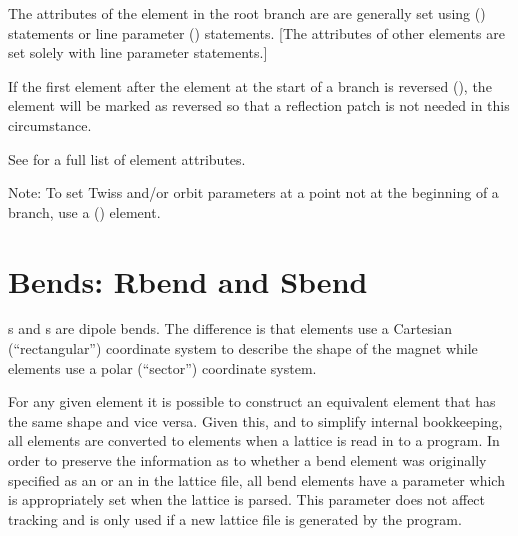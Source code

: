The attributes of the  element in the root branch are are generally set using
 () statements or line parameter () statements.
[The attributes of other  elements are set solely with line parameter statements.]

If the first element after the  element at the start of a branch is reversed
(), the  element will be marked as reversed so that a
reflection patch is not needed in this circumstance.

See  for a full list of element attributes.

Note: To set Twiss and/or orbit parameters at a point not at the beginning of a branch,
use a  () element.

\newpage

\section{Bends: Rbend and Sbend}
\label{s:bend}

s and s are dipole bends. The difference is that  elements use a
Cartesian (``rectangular'') coordinate system to describe the shape of the magnet while 
elements use a polar (``sector'') coordinate system. 

For any given  element it is possible to construct an equivalent  element that
has the same shape and vice versa. Given this, and to simplify internal bookkeeping, all 
elements are converted to  elements when a lattice is read in to a program.  In order to
preserve the information as to whether a bend element was originally specified as an  or
an  in the lattice file, all bend elements have a  parameter which is
appropriately set when the lattice is parsed. This  parameter does not affect tracking and
is only used if a new lattice file is generated by the program.

